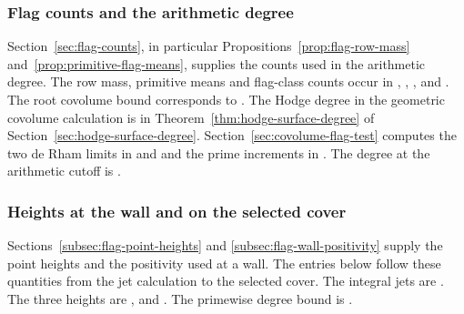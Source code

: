 \subsubsection{Flag counts and the arithmetic degree}
Section~\ref{sec:flag-counts}, in particular Propositions~\ref{prop:flag-row-mass} and~\ref{prop:primitive-flag-means}, supplies the counts used in the arithmetic degree. The row mass, primitive means and
flag-class counts occur in ,
, ,
 and . The root
covolume bound corresponds to .
The Hodge degree in the geometric covolume calculation is
 in Theorem~\ref{thm:hodge-surface-degree} of Section~\ref{sec:hodge-surface-degree}.
\cite{release,release-surface-uniform}
Section~\ref{sec:covolume-flag-test} computes the two
de Rham limits in  and
 and the prime increments in
. The degree at the arithmetic cutoff is
. \cite{release-flag-difference,
release-flag-vandermonde,release-flag-finite,release-flag-test}

\subsubsection{Heights at the wall and on the selected cover}
Sections~\ref{subsec:flag-point-heights} and
\ref{subsec:flag-wall-positivity} supply the point heights and the positivity used at a wall. The entries below follow
these quantities from the jet calculation to the selected cover. The integral jets are .
The three heights are ,
 and . The primewise degree
bound is .
\cite{release-wall-jets,release-wall-lie-points,
release-wall-boundary,release-wall-dense,release-wall-dr-nef}

